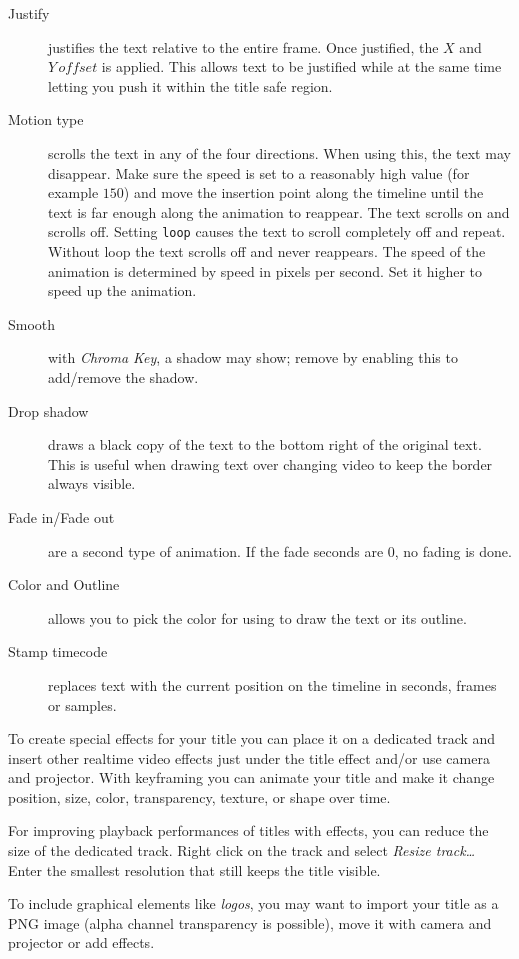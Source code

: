 \begin{description}
    \item[Justify] justifies the text relative to the entire frame. Once justified, the $X$ and $Y\, offset$ is applied. This allows text to be justified while at the same time letting you push it within the title safe region.
    \item[Motion type] scrolls the text in any of the four directions. When using this, the text may disappear. Make sure the speed is set to a reasonably high value (for example $150$) and move the insertion point along the timeline until the text is far enough along the animation to reappear. The text scrolls on and scrolls off. Setting \texttt{loop} causes the text to scroll completely off and repeat. Without loop the text scrolls off and never reappears. The speed of the animation is determined by speed in pixels per second. Set it higher to speed up the animation.
    \item[Smooth] with \textit{Chroma Key}, a shadow may show; remove by enabling this to add/remove the shadow.
    \item[Drop shadow] draws a black copy of the text to the bottom right of the original text. This is useful when drawing text over changing video to keep the border always visible.
    \item[Fade in/Fade out] are a second type of animation. If the fade seconds are $0$, no fading is done.
    \item[Color and Outline] allows you to pick the color for using to draw the text or its outline.
    \item[Stamp timecode] replaces text with the current position on the timeline in seconds, frames or samples.
\end{description}

To create special effects for your title you can place it on a dedicated track and insert other realtime video effects just under the title effect and/or use camera and projector. With keyframing you can animate your title and make it change position, size, color, transparency, texture, or shape over time.

For improving playback performances of titles with effects, you can reduce the size of the dedicated track. Right click on the track and select \textit{Resize track\dots} Enter the smallest resolution that still keeps the title visible.

To include graphical elements like \textit{logos}, you may want to import your title as a PNG image (alpha channel transparency is possible), move it with camera and projector or add effects.

